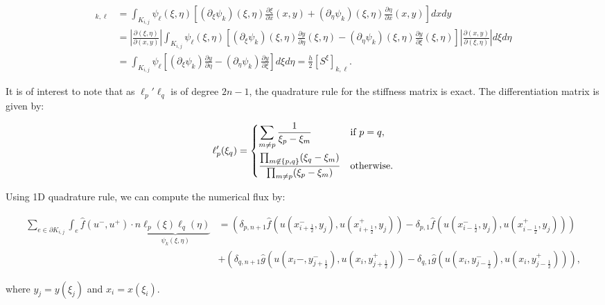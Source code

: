 \documentclass[10pt]{article}
\begin{document}
\begin{align*}
  [S^x_{i,j}]_{k,\ell} &= \int_{K_{i,j}}\psi_\ell(\xi,\eta)\left[(\partial_\xi\psi_k)(\xi,\eta)\frac{\partial\xi}{\partial x}(x,y)+(\partial_\eta\psi_k)(\xi,\eta)\frac{\partial\eta}{\partial x}(x,y)\right]dxdy \\
                       &= \left|\frac{\partial (\xi,\eta)}{\partial (x,y)}\right|\int_{K_{i,j}}\psi_\ell(\xi,\eta)\left[(\partial_\xi \psi_k)(\xi,\eta) \frac{\partial y}{\partial\eta}(\xi,\eta) - (\partial_\eta\psi_k)(\xi,\eta)\frac{\partial y}{\partial\xi}(\xi,\eta)\right] \left|\frac{\partial(x,y)}{\partial(\xi,\eta)}\right|d\xi d\eta \\
                       &= \int_{K_{i,j}}\psi_\ell\left[(\partial_\xi \psi_k) \frac{\partial y}{\partial\eta} - (\partial_\eta\psi_k)\frac{\partial y}{\partial\xi}\right]d\xi d\eta = \frac h2 [S^\xi]_{k,\ell}.
\end{align*}

It is of interest to note that as \(\ell_p'\ell_q\) is of degree \(2n-1\), the quadrature rule for the stiffness matrix is exact. The differentiation matrix is given by:

\begin{align*}
  \ell_p'(\xi_q) =
  \begin{dcases}
    \sum_{m\neq p}\frac1{\xi_p-\xi_m} & \text{if } p=q, \\
    \frac{\prod_{m\not\in\{p,q\}} (\xi_q-\xi_m)}{\prod_{m\neq p}(\xi_p-\xi_m)} & \text{otherwise.}
  \end{dcases}
\end{align*}

Using 1D quadrature rule, we can compute the numerical flux by:

\begin{align*}
  \sum_{e\in\partial K_{i,j}}\int_e \widehat{f}(u^-, u^+)\cdot n\underbrace{\ell_p(\xi)\ell_q(\eta)}_{\psi_k(\xi,\eta)} &= \left(\delta_{p,n+1}\widehat{f}\left(u\left(x_{i+\frac12}^-, y_j\right), u\left(x_{i+\frac12}^+, y_j\right)\right)-\delta_{p,1}\widehat{f}\left(u\left(x_{i-\frac12}^-, y_j\right), u\left(x_{i-\frac12}^+, y_j\right)\right)\right) \\
  &+\left(\delta_{q,n+1}\widehat{g}\left(u\left(x_i-, y_{j+\frac12}^-\right), u\left(x_i, y_{j+\frac12}^+\right)\right)-\delta_{q,1}\widehat{g}\left(u\left(x_i, y_{j-\frac12}^-\right), u\left(x_i, y_{j-\frac12}^+\right)\right)\right),
\end{align*}

where \(y_j = y(\xi_j)\) and \(x_i = x(\xi_i)\).
\end{document}
